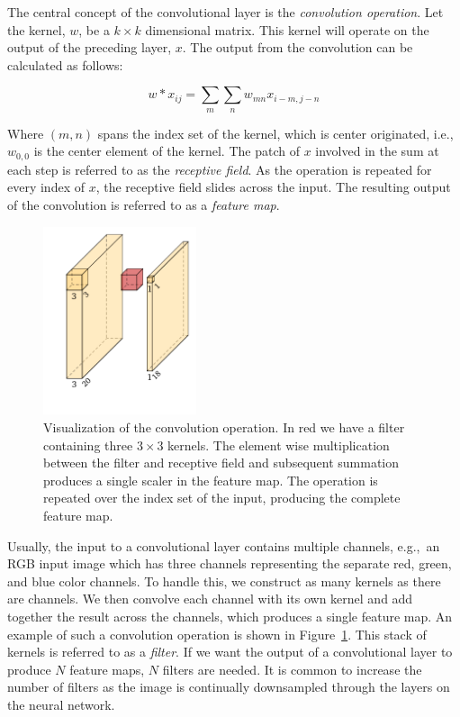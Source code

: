 The central concept of the convolutional layer is the \textit{convolution operation}.
Let the kernel, \(w\), be a \(k\times k\) dimensional matrix.
This kernel will operate on the output of the preceding layer, \(x\).
The output from the convolution can be calculated as follows:

\[w\ast x_{ij}=\sum_{m}\sum_{n}  w_{mn}x_{i-m,j-n}\]

Where \((m,n)\) spans the index set of the kernel, which is center originated, i.e., \(w_{0,0}\) is the center element of the kernel.
The patch of \(x\) involved in the sum at each step is referred to as the \textit{receptive field}.
As the operation is repeated for every index of \(x\), the receptive field slides across the input.
The resulting output of the convolution is referred to as a \textit{feature map}.

\begin{figure}[htb]
  \centering
  \includegraphics[width=0.4\textwidth]{figs/conv.pdf}
  \caption[Convolution operation]{Visualization of the convolution operation.
In red we have a filter containing three \(3\times 3\) kernels.
The element wise multiplication between the filter and receptive field and subsequent summation produces a single scaler in the feature map.
The operation is repeated over the index set of the input, producing the complete feature map.}\label{fig:cnn}
\end{figure}

Usually, the input to a convolutional layer contains multiple channels, e.g.,\ an RGB input image which has three channels representing the separate  red, green, and blue color channels.
To handle this, we construct as many kernels as there are channels.
We then convolve each channel with its own kernel and add together the result across the channels, which produces a single feature map.
An example of such a convolution operation is shown in Figure~\ref{fig:cnn}.
This stack of kernels is referred to as a \textit{filter}.
If we want the output of a convolutional layer to produce \(N\) feature maps, \(N\) filters are needed.  It is common to increase the number of filters as the image is continually downsampled through the layers on the neural network.

